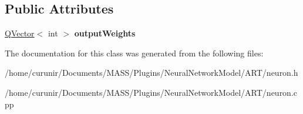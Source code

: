 \subsection*{Public Attributes}
\begin{DoxyCompactItemize}
\item 
\hyperlink{class_q_vector}{Q\+Vector}$<$ int $>$ {\bfseries output\+Weights}\hypertarget{class_neuron_aadb0bf2fa55fe14651e9b1b904112400}{}\label{class_neuron_aadb0bf2fa55fe14651e9b1b904112400}

\end{DoxyCompactItemize}


The documentation for this class was generated from the following files\+:\begin{DoxyCompactItemize}
\item 
/home/curunir/\+Documents/\+M\+A\+S\+S/\+Plugins/\+Neural\+Network\+Model/\+A\+R\+T/neuron.\+h\item 
/home/curunir/\+Documents/\+M\+A\+S\+S/\+Plugins/\+Neural\+Network\+Model/\+A\+R\+T/neuron.\+cpp\end{DoxyCompactItemize}
